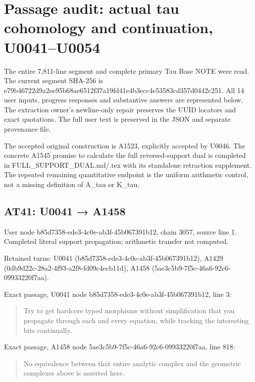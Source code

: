 \section{Passage audit: actual tau cohomology and continuation,
U0041--U0054}\label{passage-audit-actual-tau-cohomology-and-continuation-u0041u0054}

The entire 7,811-line segment and complete primary Tau Base NOTE were
read. The current segment SHA-256 is
e79b46722d9a2ee95b68ae6512f37a19fd41e4b3ecc4e53583cd357d0442c251. All 14
user inputs, progress responses and substantive answers are represented
below. The extraction owner's newline-only repair preserves the UUID
locators and exact quotations. The full user text is preserved in the
JSON and separate provenance file.

The accepted original construction is A1523, explicitly accepted by
U0046. The concrete A1545 promise to calculate the full reversed-support
dual is completed in FULL\_SUPPORT\_DUAL.md/.tex with its standalone
retraction supplement. The repeated remaining quantitative endpoint is
the uniform arithmetic control, not a missing definition of A\_tau or
K\_tau.

\subsection{AT41: U0041 → A1458}\label{at41-u0041-a1458}

User node b85d7358-ede3-4c0e-ab3f-45b067391b12, chain 3057, source line
1. Completed literal support propagation; arithmetic transfer not
computed.

Retained turns: U0041 (b85d7358-ede3-4c0e-ab3f-45b067391b12), A1429
(0db9d22c-28a2-4f93-a2f8-fd09c4ecb11d), A1458
(5ae3c5b9-7f5c-46a6-92c6-09933220f7aa).

Exact passage, U0041 node b85d7358-ede3-4c0e-ab3f-45b067391b12, line 3:

\begin{quote}
Try to get hardcore typed morphisms without simplification that you
propagate through each and every equation, while tracking the
interesting bits continually.
\end{quote}

Exact passage, A1458 node 5ae3c5b9-7f5c-46a6-92c6-09933220f7aa, line
818:

\begin{quote}
No equivalence between that entire analytic complex and the geometric
complexes above is asserted here.
\end{quote}

